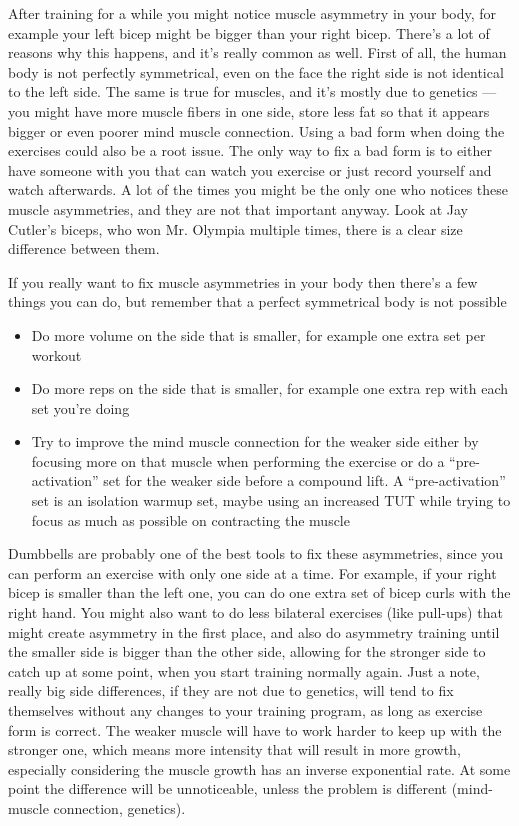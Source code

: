 \documentclass[openany, 12pt]{book}
\begin{document}
        After training for a while you might notice muscle asymmetry in your body, for example your left bicep might be bigger than your right bicep. There's a lot of reasons why this happens, and it's
        really common as well. First of all, the human body is not perfectly symmetrical, even on the face the right side is not identical to the left side. The same is true for muscles, and it's
        mostly due to genetics --- you might have more muscle fibers in one side, store less fat so that it appears bigger or even poorer mind muscle connection.
        Using a bad form when doing the exercises could also be a root issue.
        The only way to fix a bad form is to either have someone with you that can watch you exercise or just record yourself and watch afterwards. A lot of the times you might be the only one who notices
        these muscle asymmetries, and they are not that important anyway. Look at Jay Cutler's biceps, who won Mr. Olympia multiple times, there is a clear size difference between them.

        If you really want
        to fix muscle asymmetries in your body then there's a few things you can do, but remember that a perfect symmetrical body is not possible

        \begin{itemize}
          \item Do more volume on the side that is smaller, for example one extra set per workout
          \item Do more reps on the side that is smaller, for example one extra rep with each set you're doing
          \item Try to improve the mind muscle connection for the weaker side either by focusing more on that muscle when performing the exercise or do a ``pre-activation'' set for the weaker side
            before a compound lift. A ``pre-activation'' set is an isolation warmup set, maybe using an increased TUT while trying to focus as much as possible on contracting the muscle
        \end{itemize}

        Dumbbells are probably one of the best tools to fix these asymmetries, since you can perform an exercise with only one side at a time. For example, if your right bicep is smaller than
        the left one, you can do one extra set of bicep curls with the right hand.
        You might also want to do less bilateral exercises (like pull-ups) that might create asymmetry in the first place, and also do asymmetry training until the smaller side is bigger than the other
        side, allowing for the stronger side to catch up at some point, when you start training normally again.
        Just a note, really big side differences, if they are not due to genetics, will tend to fix themselves without any changes to your training program, as long as exercise form is correct.
        The weaker muscle will have to work harder to keep up with the stronger one, which means more intensity that will result in more growth, especially considering the muscle growth has an
        inverse exponential rate. At some point the difference will be unnoticeable, unless the problem is different (mind-muscle connection, genetics).
\end{document}
